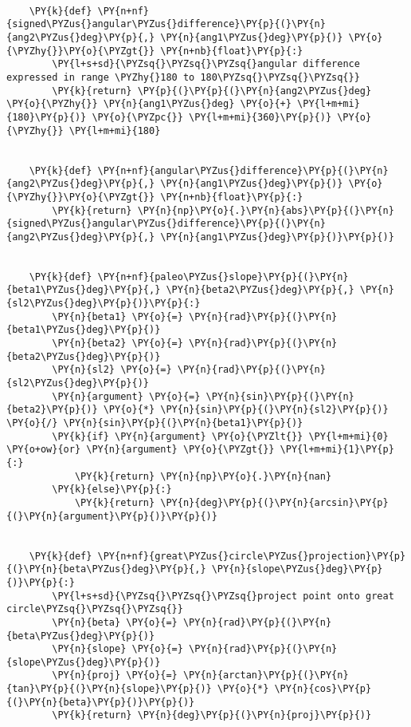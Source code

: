 \begin{tcolorbox}[breakable, size=fbox, boxrule=1pt, pad at break*=1mm,colback=cellbackground, colframe=cellborder]
\begin{Verbatim}[commandchars=\\\{\}]
    
    \PY{k}{def} \PY{n+nf}{signed\PYZus{}angular\PYZus{}difference}\PY{p}{(}\PY{n}{ang2\PYZus{}deg}\PY{p}{,} \PY{n}{ang1\PYZus{}deg}\PY{p}{)} \PY{o}{\PYZhy{}}\PY{o}{\PYZgt{}} \PY{n+nb}{float}\PY{p}{:}
        \PY{l+s+sd}{\PYZsq{}\PYZsq{}\PYZsq{}angular difference expressed in range \PYZhy{}180 to 180\PYZsq{}\PYZsq{}\PYZsq{}}
        \PY{k}{return} \PY{p}{(}\PY{p}{(}\PY{n}{ang2\PYZus{}deg} \PY{o}{\PYZhy{}} \PY{n}{ang1\PYZus{}deg} \PY{o}{+} \PY{l+m+mi}{180}\PY{p}{)} \PY{o}{\PYZpc{}} \PY{l+m+mi}{360}\PY{p}{)} \PY{o}{\PYZhy{}} \PY{l+m+mi}{180}
    
    
    \PY{k}{def} \PY{n+nf}{angular\PYZus{}difference}\PY{p}{(}\PY{n}{ang2\PYZus{}deg}\PY{p}{,} \PY{n}{ang1\PYZus{}deg}\PY{p}{)} \PY{o}{\PYZhy{}}\PY{o}{\PYZgt{}} \PY{n+nb}{float}\PY{p}{:}
        \PY{k}{return} \PY{n}{np}\PY{o}{.}\PY{n}{abs}\PY{p}{(}\PY{n}{signed\PYZus{}angular\PYZus{}difference}\PY{p}{(}\PY{n}{ang2\PYZus{}deg}\PY{p}{,} \PY{n}{ang1\PYZus{}deg}\PY{p}{)}\PY{p}{)}
    
    
    \PY{k}{def} \PY{n+nf}{paleo\PYZus{}slope}\PY{p}{(}\PY{n}{beta1\PYZus{}deg}\PY{p}{,} \PY{n}{beta2\PYZus{}deg}\PY{p}{,} \PY{n}{sl2\PYZus{}deg}\PY{p}{)}\PY{p}{:}
        \PY{n}{beta1} \PY{o}{=} \PY{n}{rad}\PY{p}{(}\PY{n}{beta1\PYZus{}deg}\PY{p}{)}
        \PY{n}{beta2} \PY{o}{=} \PY{n}{rad}\PY{p}{(}\PY{n}{beta2\PYZus{}deg}\PY{p}{)}
        \PY{n}{sl2} \PY{o}{=} \PY{n}{rad}\PY{p}{(}\PY{n}{sl2\PYZus{}deg}\PY{p}{)}
        \PY{n}{argument} \PY{o}{=} \PY{n}{sin}\PY{p}{(}\PY{n}{beta2}\PY{p}{)} \PY{o}{*} \PY{n}{sin}\PY{p}{(}\PY{n}{sl2}\PY{p}{)} \PY{o}{/} \PY{n}{sin}\PY{p}{(}\PY{n}{beta1}\PY{p}{)}
        \PY{k}{if} \PY{n}{argument} \PY{o}{\PYZlt{}} \PY{l+m+mi}{0} \PY{o+ow}{or} \PY{n}{argument} \PY{o}{\PYZgt{}} \PY{l+m+mi}{1}\PY{p}{:}
            \PY{k}{return} \PY{n}{np}\PY{o}{.}\PY{n}{nan}
        \PY{k}{else}\PY{p}{:}
            \PY{k}{return} \PY{n}{deg}\PY{p}{(}\PY{n}{arcsin}\PY{p}{(}\PY{n}{argument}\PY{p}{)}\PY{p}{)}
    
    
    \PY{k}{def} \PY{n+nf}{great\PYZus{}circle\PYZus{}projection}\PY{p}{(}\PY{n}{beta\PYZus{}deg}\PY{p}{,} \PY{n}{slope\PYZus{}deg}\PY{p}{)}\PY{p}{:}
        \PY{l+s+sd}{\PYZsq{}\PYZsq{}\PYZsq{}project point onto great circle\PYZsq{}\PYZsq{}\PYZsq{}}
        \PY{n}{beta} \PY{o}{=} \PY{n}{rad}\PY{p}{(}\PY{n}{beta\PYZus{}deg}\PY{p}{)}
        \PY{n}{slope} \PY{o}{=} \PY{n}{rad}\PY{p}{(}\PY{n}{slope\PYZus{}deg}\PY{p}{)}
        \PY{n}{proj} \PY{o}{=} \PY{n}{arctan}\PY{p}{(}\PY{n}{tan}\PY{p}{(}\PY{n}{slope}\PY{p}{)} \PY{o}{*} \PY{n}{cos}\PY{p}{(}\PY{n}{beta}\PY{p}{)}\PY{p}{)}
        \PY{k}{return} \PY{n}{deg}\PY{p}{(}\PY{n}{proj}\PY{p}{)}
    

\end{Verbatim}
\end{tcolorbox}
